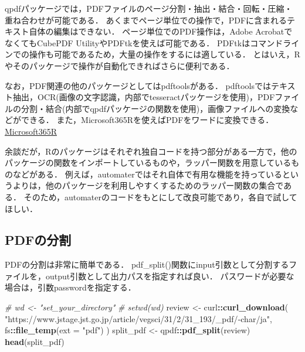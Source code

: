 \documentclass[
]{article}
\newenvironment{Shaded}{\begin{snugshade}}{\end{snugshade}}
\newcommand{\AttributeTok}[1]{\textcolor[rgb]{0.13,0.29,0.53}{#1}}
\newcommand{\CommentTok}[1]{\textcolor[rgb]{0.56,0.35,0.01}{\textit{#1}}}
\newcommand{\FunctionTok}[1]{\textcolor[rgb]{0.13,0.29,0.53}{\textbf{#1}}}
\newcommand{\NormalTok}[1]{#1}
\newcommand{\OtherTok}[1]{\textcolor[rgb]{0.56,0.35,0.01}{#1}}
\newcommand{\SpecialCharTok}[1]{\textcolor[rgb]{0.81,0.36,0.00}{\textbf{#1}}}
\newcommand{\StringTok}[1]{\textcolor[rgb]{0.31,0.60,0.02}{#1}}
\begin{document}
qpdfパッケージでは，PDFファイルのページ分割・抽出・結合・回転・圧縮・重ね合わせが可能である．
あくまでページ単位での操作で，PDFに含まれるテキスト自体の編集はできない．
ページ単位でのPDF操作は，Adobe AcrobatでなくてもCubePDF UtilityやPDFtkを使えば可能である．
PDFtkはコマンドラインでの操作も可能であるため，大量の操作をするには適している．
とはいえ，Rやそのパッケージで操作が自動化できればさらに便利である．

なお，PDF関連の他のパッケージとしてはpdftoolsがある．
pdftoolsではテキスト抽出，OCR(画像の文字認識，内部でtesseractパッケージを使用)，PDFファイルの分割・結合(内部でqpdfパッケージの関数を使用)，画像ファイルへの変換などができる．
また，Microsoft365Rを使えばPDFをワードに変換できる．
\protect\hyperlink{microsoft365r}{Microsoft365R}

余談だが，Rのパッケージはそれぞれ独自コードを持つ部分がある一方で，他のパッケージの関数をインポートしているものや，ラッパー関数を用意しているものなどがある．
例えば，automaterではそれ自体で有用な機能を持っているというよりは，他のパッケージを利用しやすくするためのラッパー関数の集合である．
そのため，automaterのコードをもとにして改良可能であり，各自で試してほしい．

\hypertarget{pdfux306eux5206ux5272}{%
\subsection{PDFの分割}\label{pdfux306eux5206ux5272}}

PDFの分割は非常に簡単である．
pdf\_split()関数にinput引数として分割するファイルを，output引数として出力パスを指定すれば良い．
パスワードが必要な場合は，引数passwordを指定する．

\begin{Shaded}
\begin{Highlighting}[]
  \CommentTok{\# wd \textless{}{-} "set\_your\_directory"}
  \CommentTok{\# setwd(wd)}
\NormalTok{review }\OtherTok{\textless{}{-}} 
\NormalTok{  curl}\SpecialCharTok{::}\FunctionTok{curl\_download}\NormalTok{(}
    \StringTok{"https://www.jstage.jst.go.jp/article/vegsci/31/2/31\_193/\_pdf/{-}char/ja"}\NormalTok{, }
\NormalTok{    fs}\SpecialCharTok{::}\FunctionTok{file\_temp}\NormalTok{(}\AttributeTok{ext =} \StringTok{"pdf"}\NormalTok{)}
\NormalTok{    )}
\NormalTok{split\_pdf }\OtherTok{\textless{}{-}}\NormalTok{ qpdf}\SpecialCharTok{::}\FunctionTok{pdf\_split}\NormalTok{(review)}
\FunctionTok{head}\NormalTok{(split\_pdf)}
\end{Highlighting}
\end{Shaded}
\end{document}
